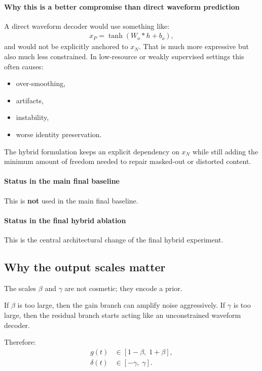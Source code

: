 \documentclass[11pt]{article}
\begin{document}
\paragraph{Why this is a better compromise than direct waveform prediction}
A direct waveform decoder would use something like:
\begin{align}
    x_P = \tanh(W_o * h + b_o),
\end{align}
and would not be explicitly anchored to $x_N$. That is much more expressive but also much less constrained. In low-resource or weakly supervised settings this often causes:
\begin{itemize}[leftmargin=*]
    \item over-smoothing,
    \item artifacts,
    \item instability,
    \item worse identity preservation.
\end{itemize}

The hybrid formulation keeps an explicit dependency on $x_N$ while still adding the minimum amount of freedom needed to repair masked-out or distorted content.

\paragraph{Status in the main final baseline}
This is \textbf{not} used in the main final baseline.

\paragraph{Status in the final hybrid ablation}
This is the central architectural change of the final hybrid experiment.

\subsection{Why the output scales matter}
The scales $\beta$ and $\gamma$ are not cosmetic; they encode a prior.

If $\beta$ is too large, then the gain branch can amplify noise aggressively. If $\gamma$ is too large, then the residual branch starts acting like an unconstrained waveform decoder.

Therefore:
\begin{align}
    g(t) &\in [1-\beta,\; 1+\beta], \\
    \delta(t) &\in [-\gamma,\; \gamma].
\end{align}
\end{document}
